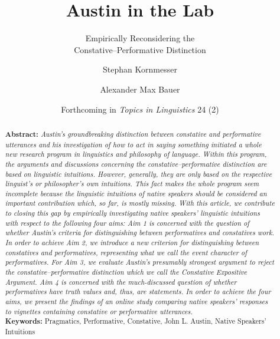 \documentclass[egregdoesnotlikesansseriftitles,12pt]{scrartcl}
\title{Austin in the Lab}
\subtitle{Empirically Reconsidering the\\Constative--Performative Distinction}
\author[1*]{Stephan Kornmesser}
\author[1]{Alexander Max Bauer}
\affil[1]{ Department of Philosophy, University of Oldenburg, Germany}
\affil[*]{ Corresponding Author, E-Mail: \href{mailto:stephan.kornmesser@uni-oldenburg.de}{stephan.kornmesser@uni-oldenburg.de}}
\date{\small Forthcoming in \textit{Topics in Linguistics} 24 (2)}
\begin{document}
\maketitle

\vspace{\fill}
\begin{abstract}
   \noindent\textbf{Abstract:} \textit{Austin's groundbreaking distinction between constative and performative utterances and his investigation of how to act in saying something initiated a whole new research program in linguistics and philosophy of language. Within this program, the arguments and discussions concerning the constative--performative distinction are based on linguistic intuitions. However, generally, they are only based on the respective linguist's or philosopher's own intuitions. This fact makes the whole program seem incomplete because the linguistic intuitions of native speakers should be considered an important contribution which, so far, is mostly missing. With this article, we contribute to closing this gap by empirically investigating native speakers' linguistic intuitions with respect to the following four aims: Aim 1 is concerned with the question of whether Austin's criteria for distinguishing between performatives and constatives work. In order to achieve Aim 2, we introduce a new criterion for distinguishing between constatives and performatives, representing what we call the event character of performatives. For Aim 3, we evaluate Austin's presumably strongest argument to reject the constative--performative distinction which we call the Constative Expositive Argument. Aim 4 is concerned with the much-discussed question of whether performatives have truth values and, thus, are statements. In order to achieve the four aims, we present the findings of an online study comparing native speakers' responses to vignettes containing constative or performative utterances.}\\[2ex]
   \textbf{Keywords:} Pragmatics, Performative, Constative, John L. Austin, Native Speakers' Intuitions
\end{abstract}


\clearpage
\end{document}
